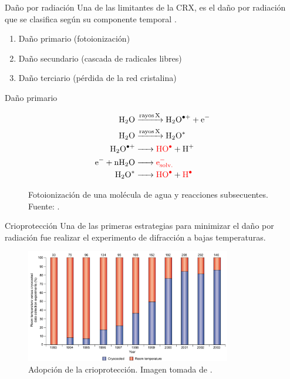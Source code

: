 \documentclass{beamer}
\begin{document}
\begin{frame}{Daño por radiación}
Una de las limitantes de la CRX, es el daño por radiación que se clasifica según su componente temporal \cite{Teng2000}.
 \begin{enumerate}
  \item Daño primario (fotoionización)
  \item Daño secundario (cascada de radicales libres)
  \item Daño terciario (pérdida de la red cristalina)
 \end{enumerate}
\end{frame}
\begin{frame}{Daño primario}
 \begin{figure}
  \begin{align}
  \ce{H2O &->[rayos X] H2O^{.+} + e^{-}}  \\
  \ce{H2O &->[rayos X] H2O^{*}}           \\
  \ce{H2O^{.+} &-> \color{red}HO^{.} + H^{+}} \\
  \ce{e^{-} + nH2O &-> \color{red}e^{-}_{solv.}} \\
  \ce{H2O^{*} &-> \color{red}HO^{.} + \color{red}H^{.}}
  \end{align} 
  \caption{Fotoionización de una molécula de agua y reacciones subsecuentes. Fuente: \cite{VonSonntag2006}.}  
  \label{fig:vonsonntag2006}
 \end{figure}
\end{frame}
\begin{frame}{Crioprotección}
Una de las primeras estrategias para minimizar el daño por radiación fue realizar el experimento de difracción a bajas temperaturas.
 \begin{figure}[h]
  \centering
  \includegraphics[width=0.8\textwidth]{garman2003.png}
  \caption{Adopción de la crioprotección. Imagen tomada de \cite{Garman2003}.}
  \label{fig:garman2003}
 \end{figure}
\end{frame}
\end{document}
